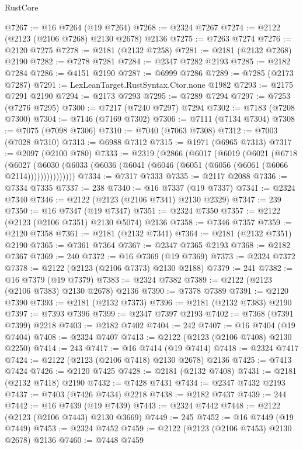 \begin{lexlean}{RustCore}
\begin{coremodule}
@7267 := @16 @7264 (@19 @7264)
@7268 := @2324 @7267
@7274 := @2122 (@2123 (@2106 @7268) @2130 @2678) @2136
@7275 := @7263 @7274
@7276 := @2120 @7275
@7278 := @2181 (@2132 @7258)
@7281 := @2181 (@2132 @7268) @2190
@7282 := @7278 @7281
@7284 := @2347 @7282 @2193
@7285 := @2182 @7284
@7286 := @4151 @2190
@7287 := @6999 @7286
@7289 := @7285 (@2173 @7287)
@7291 := LexLeanTarget.RustSyntax.Ctor.none @1982
@7293 := @2175 @7291 @2190
@7294 := @2173 @7293
@7295 := @7289 @7294
@7297 := @7253 (@7276 @7295)
@7300 := @7217 (@7240 @7297) @7294
@7302 := @7183 (@7208 @7300)
@7304 := @7146 (@7169 @7302)
@7306 := @7111 (@7134 @7304)
@7308 := @7075 (@7098 @7306)
@7310 := @7040 (@7063 @7308)
@7312 := @7003 (@7028 @7310)
@7313 := @6988 @7312
@7315 := @1971 (@6965 @7313)
@7317 := @2097 (@2100 @780)
@7333 := @2319
    (@2866
      (@6017
        (@6019
          (@6021
            (@6718
              (@6027
                (@6030 (@6033 (@6036 (@6041 (@6046 (@6051 (@6056 (@6061 (@6066 @2114)))))))))))))))
@7334 := @7317 @7333
@7335 := @2117 @2088
@7336 := @7334 @7335
@7337 := 238
@7340 := @16 @7337 (@19 @7337)
@7341 := @2324 @7340
@7346 := @2122 (@2123 (@2106 @7341) @2130 @2329)
@7347 := 239
@7350 := @16 @7347 (@19 @7347)
@7351 := @2324 @7350
@7357 := @2122 (@2123 (@2106 @7351) @2130 @5074) @2136
@7358 := @7346 @7357
@7359 := @2120 @7358
@7361 := @2181 (@2132 @7341)
@7364 := @2181 (@2132 @7351) @2190
@7365 := @7361 @7364
@7367 := @2347 @7365 @2193
@7368 := @2182 @7367
@7369 := 240
@7372 := @16 @7369 (@19 @7369)
@7373 := @2324 @7372
@7378 := @2122 (@2123 (@2106 @7373) @2130 @2188)
@7379 := 241
@7382 := @16 @7379 (@19 @7379)
@7383 := @2324 @7382
@7389 := @2122 (@2123 (@2106 @7383) @2130 @2678) @2136
@7390 := @7378 @7389
@7391 := @2120 @7390
@7393 := @2181 (@2132 @7373)
@7396 := @2181 (@2132 @7383) @2190
@7397 := @7393 @7396
@7399 := @2347 @7397 @2193
@7402 := @7368 (@7391 @7399) @2218
@7403 := @2182 @7402
@7404 := 242
@7407 := @16 @7404 (@19 @7404)
@7408 := @2324 @7407
@7413 := @2122 (@2123 (@2106 @7408) @2130 @2250)
@7414 := 243
@7417 := @16 @7414 (@19 @7414)
@7418 := @2324 @7417
@7424 := @2122 (@2123 (@2106 @7418) @2130 @2678) @2136
@7425 := @7413 @7424
@7426 := @2120 @7425
@7428 := @2181 (@2132 @7408)
@7431 := @2181 (@2132 @7418) @2190
@7432 := @7428 @7431
@7434 := @2347 @7432 @2193
@7437 := @7403 (@7426 @7434) @2218
@7438 := @2182 @7437
@7439 := 244
@7442 := @16 @7439 (@19 @7439)
@7443 := @2324 @7442
@7448 := @2122 (@2123 (@2106 @7443) @2130 @3669)
@7449 := 245
@7452 := @16 @7449 (@19 @7449)
@7453 := @2324 @7452
@7459 := @2122 (@2123 (@2106 @7453) @2130 @2678) @2136
@7460 := @7448 @7459

\end{coremodule}
\end{lexlean}
